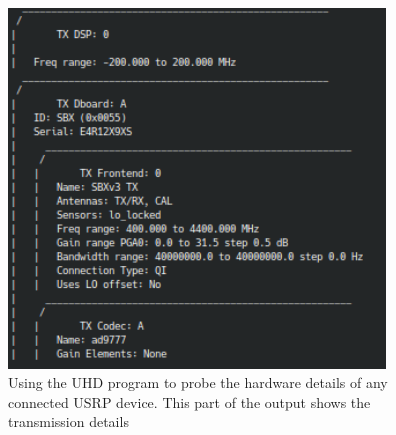 \begin{figure}[H]
    \begin{centering}
        \includegraphics[width=10cm,keepaspectratio]{Figures/usrp-probe-output_3.png}
        \caption{Using the UHD program to probe the hardware details of any connected USRP device. This part of the output shows the transmission details}
    \label{fig:UHDProbe3}
    \end{centering}
\end{figure}

